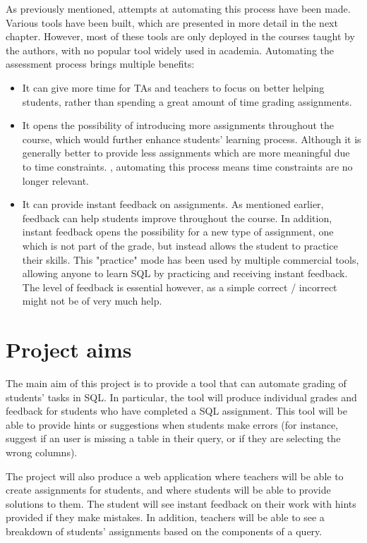 As previously mentioned, attempts at automating this process have been made. Various tools have been built, which are presented in more detail in the next chapter. However, most of these tools are only deployed in the courses taught by the authors, with no popular tool widely used in academia. Automating the assessment process brings multiple benefits:
\begin{itemize}
    \item It can give more time for TAs and teachers to focus on better helping students, rather than spending a great amount of time grading assignments.
    \item It opens the possibility of introducing more assignments throughout the course, which would further enhance students' learning process. Although it is generally better to provide less assignments which are more meaningful due to time constraints. \citep{literature:assement}, automating this process means time constraints are no longer relevant.
    \item It can provide instant feedback on assignments. As mentioned earlier, feedback can help students improve throughout the course. In addition, instant feedback opens the possibility for a new type of assignment, one which is not part of the grade, but instead allows the student to practice their skills. This "practice" mode has been used by multiple commercial tools, allowing anyone to learn SQL by practicing and receiving instant feedback. The level of feedback is essential however, as a simple correct / incorrect might not be of very much help.
\end{itemize}


\section{Project aims} \label{ch:introduction:sec:project_aims}

The main aim of this project is to provide a tool that can automate grading of students' tasks in SQL. In particular, the tool will produce individual grades and feedback for students who have completed a SQL assignment. This tool will be able to provide hints or suggestions when students make errors (for instance, suggest if an user is missing a table in their query, or if they are selecting the wrong columns).

The project will also produce a web application where teachers will be able to create assignments for students, and where students will be able to provide solutions to them. The student will see instant feedback on their work with hints provided if they make mistakes. In addition, teachers will be able to see a breakdown of students' assignments based on the components of a query.

